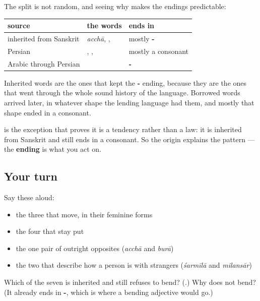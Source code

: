 \begin{grammarlens}[title={Grammar Lens: where each word came from}]
The split is not random, and seeing why makes the endings predictable:

\noindent
\begin{tabularx}{\linewidth}{@{}>{\raggedright\arraybackslash}X>{\raggedright\arraybackslash}X>{\raggedright\arraybackslash}X@{}}
\toprule
\textbf{source} & \textbf{the words} & \textbf{ends in} \\
\midrule
inherited from Sanskrit & \emph{acchā}, \hi{बुरा}, \hi{गंभीर} & mostly \textbf{-\hi{आ}} \\
Persian & \hi{होशियार}, \hi{मिलनसार}, \hi{शर्मीला} & mostly a consonant \\
Arabic through Persian & \hi{मेहनती} & \textbf{-\hi{ई}} \\
\bottomrule
\end{tabularx}

Inherited words are the ones that kept the \textbf{-} ending, because they are the ones that went through the whole sound history of the language. Borrowed words arrived later, in whatever shape the lending language had them, and mostly that shape ended in a consonant.

\textbf{} is the exception that proves it is a tendency rather than a law: it is inherited from Sanskrit and still ends in a consonant. So the origin explains the pattern — the \textbf{ending} is what you act on.
\end{grammarlens}

\subsection*{Your turn}
Say these aloud:

\begin{itemize}
\raggedright
  \item the three that move, in their feminine forms
  \item the four that stay put
  \item the one pair of outright opposites (\emph{acchā} and \emph{burā})
  \item the two that describe how a person is with strangers (\emph{śarmīlā} and \emph{milansār})
\end{itemize}

\begin{tcolorbox}[breakable,colback=teal!4,colframe=teal!35!black,title={Before you move on}]
Which of the seven is inherited and still refuses to bend? (\textbf{}.) Why does \textbf{} not bend? (It already ends in \textbf{-}, which is where a bending adjective would go.)
\end{tcolorbox}
